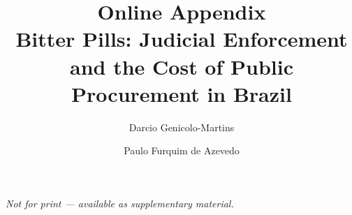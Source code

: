 \documentclass[12pt]{elsarticle}
\begin{document}
\begin{frontmatter}
\title{Online Appendix\\[6pt]
\large Bitter Pills: Judicial Enforcement and the Cost of Public Procurement in Brazil}
\author[INSPER]{Darcio Genicolo-Martins}
\author[INSPER]{Paulo Furquim de Azevedo}
\address[INSPER]{Insper Institute of Education and Research, S\~ao Paulo, Brazil}
\end{frontmatter}

\noindent\textit{Not for print --- available as supplementary material.}

\bigskip


\end{document}
